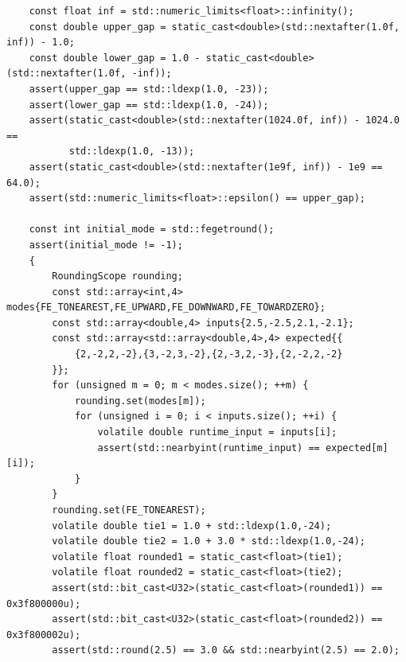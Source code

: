 \begin{verbatim}
    const float inf = std::numeric_limits<float>::infinity();
    const double upper_gap = static_cast<double>(std::nextafter(1.0f, inf)) - 1.0;
    const double lower_gap = 1.0 - static_cast<double>(std::nextafter(1.0f, -inf));
    assert(upper_gap == std::ldexp(1.0, -23));
    assert(lower_gap == std::ldexp(1.0, -24));
    assert(static_cast<double>(std::nextafter(1024.0f, inf)) - 1024.0 ==
           std::ldexp(1.0, -13));
    assert(static_cast<double>(std::nextafter(1e9f, inf)) - 1e9 == 64.0);
    assert(std::numeric_limits<float>::epsilon() == upper_gap);

    const int initial_mode = std::fegetround();
    assert(initial_mode != -1);
    {
        RoundingScope rounding;
        const std::array<int,4> modes{FE_TONEAREST,FE_UPWARD,FE_DOWNWARD,FE_TOWARDZERO};
        const std::array<double,4> inputs{2.5,-2.5,2.1,-2.1};
        const std::array<std::array<double,4>,4> expected{{
            {2,-2,2,-2},{3,-2,3,-2},{2,-3,2,-3},{2,-2,2,-2}
        }};
        for (unsigned m = 0; m < modes.size(); ++m) {
            rounding.set(modes[m]);
            for (unsigned i = 0; i < inputs.size(); ++i) {
                volatile double runtime_input = inputs[i];
                assert(std::nearbyint(runtime_input) == expected[m][i]);
            }
        }
        rounding.set(FE_TONEAREST);
        volatile double tie1 = 1.0 + std::ldexp(1.0,-24);
        volatile double tie2 = 1.0 + 3.0 * std::ldexp(1.0,-24);
        volatile float rounded1 = static_cast<float>(tie1);
        volatile float rounded2 = static_cast<float>(tie2);
        assert(std::bit_cast<U32>(static_cast<float>(rounded1)) == 0x3f800000u);
        assert(std::bit_cast<U32>(static_cast<float>(rounded2)) == 0x3f800002u);
        assert(std::round(2.5) == 3.0 && std::nearbyint(2.5) == 2.0);


\end{verbatim}

